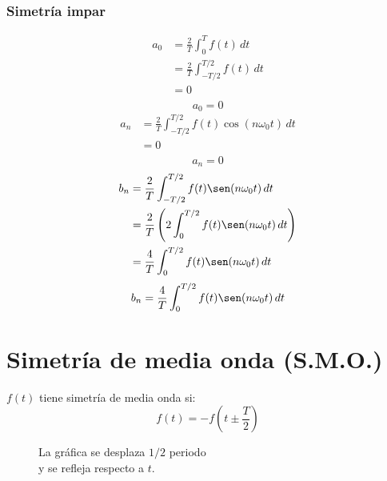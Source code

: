 \subsubsection{Simetría impar}
\begin{equation*}
\begin{split}
    a_0
        &=\frac{2}{T}\int_0^T f(t)\,dt\\
        &=\frac{2}{T}\int_{-T/2}^{T/2} f(t)\,dt\\
        &=0\\
\end{split}
\end{equation*}
\begin{equation}
    a_0=0
\end{equation}
\begin{equation*}
\begin{split}
    a_n
        &=\frac{2}{T}\int_{-T/2}^{T/2} f(t)\cos(n\omega_0 t)\,dt\\
        &=0\\
\end{split}
\end{equation*}
\begin{equation}
    a_n=0
\end{equation}
\begin{equation*}
\begin{split}
    b_n
        &=\frac{2}{T}\int_{-T/2}^{T/2} f(t)\sen(n\omega_0 t)\,dt\\
        &=\frac{2}{T}\left(2\int_0^{T/2} f(t)\sen(n\omega_0 t)\,dt\right)\\
        &=\frac{4}{T}\int_0^{T/2}f(t)\sen(n\omega_0 t)\,dt\\
\end{split}
\end{equation*}
\begin{equation}
    b_n=\frac{4}{T}\int_0^{T/2}f(t)\sen(n\omega_0 t)\,dt
\end{equation}

\section{Simetría de media onda (S.M.O.)}
$f(t)$ tiene simetría de media onda si:
\begin{equation*}
    f(t)=-f(t\pm\frac{T}{2})
\end{equation*}
\begin{figure}[H]
    \centering
    
    \caption{La gráfica se desplaza $1/2$ periodo\\
    y se refleja respecto a $t$.}
\end{figure}

